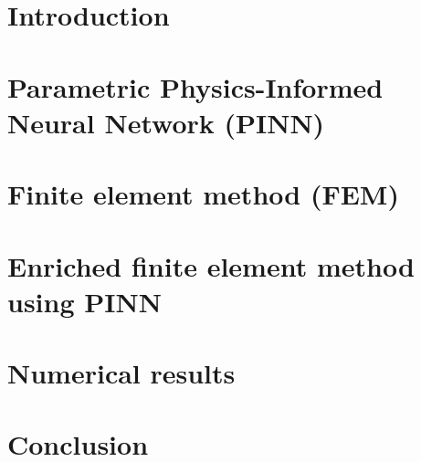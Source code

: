 \documentclass[compress,10pt,xcolor={table,dvipsnames},t]{beamer} %
\newcommand{\insertsectionheadSubtitle}{}
\begin{document}
	\section*{Introduction}
	

	
	\renewcommand{\insertsectionheadSubtitle}{The PINN is parametrized by the $\bm{\mu}$ parameter.}
	\section{Parametric Physics-Informed Neural Network (PINN)}
	
	\renewcommand{\insertsectionheadSubtitle}{}

	\renewcommand{\insertsectionheadSubtitle}{The $\bm{\mu}$ parameter is fixed in the FE resolution.}
	\section{Finite element method (FEM)}
	
	\renewcommand{\insertsectionheadSubtitle}{}

	\section{Enriched finite element method using PINN}
	

	\renewcommand{\insertsectionheadSubtitle}{
		\begin{itemize}
			\item Results obtained with a laptop GPU.
			\item The newton solver is the same for all methods (rtol$=10^{-10}$, atol$=10^{-10}$, max\_it$=30$).
			\item Additive approach : we consider $u_\theta$ in a $\mathbb{P}_3^2\times \mathbb{P}_2 \times \mathbb{P}_3$ continuous Lagrange FE space (defined on the current mesh).
		\end{itemize}}
	\section{Numerical results}
	
	\renewcommand{\insertsectionheadSubtitle}{}

	\section*{Conclusion}
\end{document}
